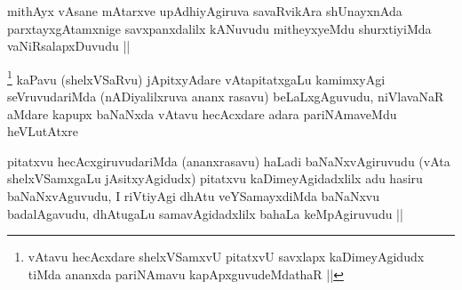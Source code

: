 
\begin{artha}
mithAyx vAsane mAtarxve upAdhiyAgiruva savaRvikAra shUnayxnAda parxtayxgAtamxnige savxpanxdalilx kANuvudu mitheyxyeMdu shurxtiyiMda vaNiRsalapxDuvudu ||
\end{artha}


\begin{artha}
\footnote{vAtavu hecAcxdare shelxVSamxvU pitatxvU savxlapx kaDimeyAgidudx tiMda ananxda pariNAmavu kapApxguvudeMdathaR ||}
kaPavu (shelxVSaRvu) jApitxyAdare vAtapitatxgaLu kamimxyAgi seVruvudariMda (nADiyalilxruva ananx rasavu) beLaLxgAguvudu, niVlavaNaR aMdare kapupx baNaNxda vAtavu hecAcxdare adara pariNAmaveMdu heVLutAtxre
\end{artha}

\begin{artha}
pitatxvu hecAcxgiruvudariMda (ananxrasavu) haLadi baNaNxvAgiruvudu (vAta shelxVSamxgaLu jAsitxyAgidudx) pitatxvu kaDimeyAgidadxlilx adu hasiru baNaNxvAguvudu, I riVtiyAgi dhAtu veYSamayxdiMda baNaNxvu badalAgavudu, dhAtugaLu samavAgidadxlilx bahaLa keMpAgiruvudu ||
\end{artha}

